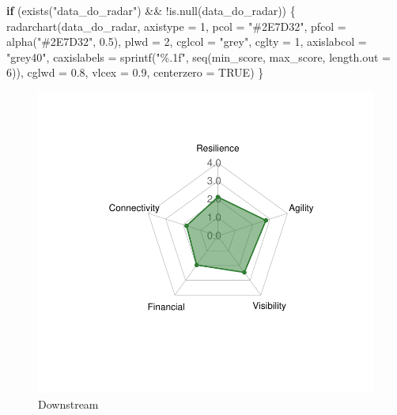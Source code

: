 \documentclass[
  letterpaper,
  DIV=11,
  numbers=noendperiod]{scrartcl}
\newenvironment{Shaded}{\begin{snugshade}}{\end{snugshade}}
\newcommand{\AttributeTok}[1]{\textcolor[rgb]{0.40,0.45,0.13}{#1}}
\newcommand{\ConstantTok}[1]{\textcolor[rgb]{0.56,0.35,0.01}{#1}}
\newcommand{\ControlFlowTok}[1]{\textcolor[rgb]{0.00,0.23,0.31}{\textbf{#1}}}
\newcommand{\DecValTok}[1]{\textcolor[rgb]{0.68,0.00,0.00}{#1}}
\newcommand{\FloatTok}[1]{\textcolor[rgb]{0.68,0.00,0.00}{#1}}
\newcommand{\FunctionTok}[1]{\textcolor[rgb]{0.28,0.35,0.67}{#1}}
\newcommand{\NormalTok}[1]{\textcolor[rgb]{0.00,0.23,0.31}{#1}}
\newcommand{\SpecialCharTok}[1]{\textcolor[rgb]{0.37,0.37,0.37}{#1}}
\newcommand{\StringTok}[1]{\textcolor[rgb]{0.13,0.47,0.30}{#1}}
\begin{document}
\begin{Shaded}
\begin{Highlighting}[]
\ControlFlowTok{if}\NormalTok{ (}\FunctionTok{exists}\NormalTok{(}\StringTok{"data\_do\_radar"}\NormalTok{) }\SpecialCharTok{\&\&} \SpecialCharTok{!}\FunctionTok{is.null}\NormalTok{(data\_do\_radar)) \{}
  \FunctionTok{radarchart}\NormalTok{(data\_do\_radar, }\AttributeTok{axistype =} \DecValTok{1}\NormalTok{, }
             \AttributeTok{pcol =} \StringTok{"\#2E7D32"}\NormalTok{, }\AttributeTok{pfcol =} \FunctionTok{alpha}\NormalTok{(}\StringTok{"\#2E7D32"}\NormalTok{, }\FloatTok{0.5}\NormalTok{), }\AttributeTok{plwd =} \DecValTok{2}\NormalTok{,}
             \AttributeTok{cglcol =} \StringTok{"grey"}\NormalTok{, }\AttributeTok{cglty =} \DecValTok{1}\NormalTok{, }\AttributeTok{axislabcol =} \StringTok{"grey40"}\NormalTok{, }
             \AttributeTok{caxislabels =} \FunctionTok{sprintf}\NormalTok{(}\StringTok{"\%.1f"}\NormalTok{, }\FunctionTok{seq}\NormalTok{(min\_score, max\_score, }\AttributeTok{length.out =} \DecValTok{6}\NormalTok{)), }
             \AttributeTok{cglwd =} \FloatTok{0.8}\NormalTok{, }\AttributeTok{vlcex =} \FloatTok{0.9}\NormalTok{, }\AttributeTok{centerzero =} \ConstantTok{TRUE}\NormalTok{)}
\NormalTok{\}}
\end{Highlighting}
\end{Shaded}

\begin{figure}[H]

{\centering \includegraphics[width=0.9\linewidth,height=\textheight,keepaspectratio]{example_3_files/figure-pdf/unnamed-chunk-3-1.pdf}

}

\caption{Downstream}

\end{figure}%
\end{document}
